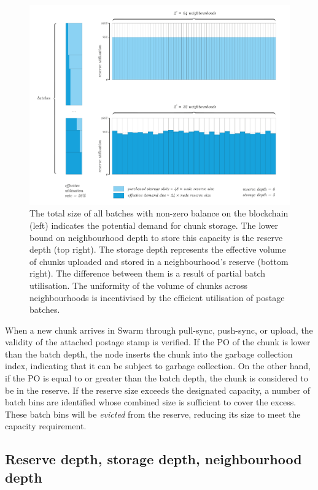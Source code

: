 \begin{figure}[!ht]
  \centering
    \includegraphics[width=.9\textwidth]{fig/supply-demand.pdf}
  \caption[Reserve capacity]{The total size of all batches with non-zero balance on the blockchain (left) indicates the potential demand for chunk storage. The lower bound on neighbourhood depth to store this capacity is the reserve depth (top right). The storage depth represents the effective volume of chunks uploaded and stored in a neighbourhood's reserve (bottom right). The difference between them is a result of partial batch utilisation. The uniformity of the volume of chunks across neighbourhoods is incentivised by the efficient utilisation of postage batches.}
\label{fig:reserve-capacity}
\end{figure}    

When a new chunk arrives in Swarm through pull-sync, push-sync, or upload, the validity  of the attached  postage stamp is verified. If the PO of the chunk is lower than the batch depth, the node inserts the chunk into the  garbage collection index, indicating that it can be subject to garbage collection. On the other hand, if the PO is equal to or greater than the batch depth, the chunk is considered to be in the reserve. 
If the reserve size exceeds the designated capacity, a number of batch bins are identified whose combined size is sufficient to cover the excess. These batch bins will be \emph{evicted} from the reserve, reducing its size to meet the capacity requirement. 


\subsection{Reserve depth, storage depth, neighbourhood depth}\label{sec:depths}



